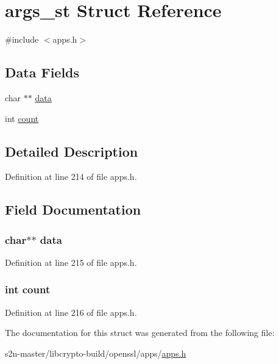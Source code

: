 \hypertarget{structargs__st}{}\section{args\+\_\+st Struct Reference}
\label{structargs__st}


{\ttfamily \#include $<$apps.\+h$>$}

\subsection*{Data Fields}
\begin{DoxyCompactItemize}
\item 
char $\ast$$\ast$ \hyperlink{structargs__st_a6b121cb8ec17d1734645f705377f63df}{data}
\item 
int \hyperlink{structargs__st_ad43c3812e6d13e0518d9f8b8f463ffcf}{count}
\end{DoxyCompactItemize}


\subsection{Detailed Description}


Definition at line 214 of file apps.\+h.



\subsection{Field Documentation}
\subsubsection[{\texorpdfstring{data}{data}}]{\setlength{\rightskip}{0pt plus 5cm}char$\ast$$\ast$ data}\hypertarget{structargs__st_a6b121cb8ec17d1734645f705377f63df}{}\label{structargs__st_a6b121cb8ec17d1734645f705377f63df}


Definition at line 215 of file apps.\+h.

\subsubsection[{\texorpdfstring{count}{count}}]{\setlength{\rightskip}{0pt plus 5cm}int count}\hypertarget{structargs__st_ad43c3812e6d13e0518d9f8b8f463ffcf}{}\label{structargs__st_ad43c3812e6d13e0518d9f8b8f463ffcf}


Definition at line 216 of file apps.\+h.



The documentation for this struct was generated from the following file\+:\begin{DoxyCompactItemize}
\item 
s2n-\/master/libcrypto-\/build/openssl/apps/\hyperlink{apps_8h}{apps.\+h}\end{DoxyCompactItemize}

